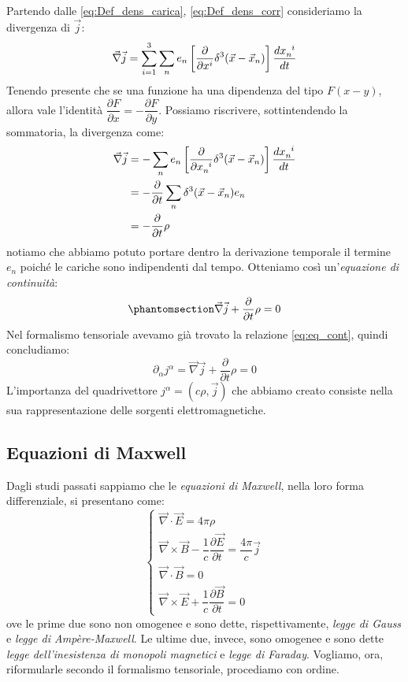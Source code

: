 Partendo dalle \eqref{eq:Def_dens_carica}, \eqref{eq:Def_dens_corr} consideriamo la divergenza di $\Vec{j}$:
\begin{equation}
    \Vec{\nabla}\Vec{j}=\sum_{i=1}^3\sum_n e_n\left[\dfrac{\partial}{\partial x^i}\delta^3(\Vec{x}-\Vec{x}_n)\right]  \dfrac{dx\indices{_n^i}}{dt}
\end{equation}
Tenendo presente che se una funzione ha una dipendenza del tipo $F(x-y)$, allora vale l'identità $\dfrac{\partial F}{\partial x}=-\dfrac{\partial F}{\partial y}$. Possiamo riscrivere, sottintendendo la sommatoria, la divergenza come:
\begin{equation}
\begin{split}
    \Vec{\nabla}\Vec{j}&=-\sum_n e_n\left[\dfrac{\partial}{\partial x\indices{_n^i}}\delta^3(\Vec{x}-\Vec{x}_n)\right] \dfrac{dx\indices{_n^i}}{dt}\\
    &=-\dfrac{\partial}{\partial t}\sum_n \delta^3(\Vec{x}-\Vec{x}_n) e_n\\
    &=-\dfrac{\partial}{\partial t} \rho 
    \end{split}
\end{equation}
notiamo che abbiamo potuto portare dentro la derivazione temporale il termine $e_n$ poiché le cariche sono indipendenti dal tempo.
Otteniamo così un'\textit{equazione di continuità}:
\begin{equation}\phantomsection\label{eq:eq_cont_elett}
    \Vec{\nabla}\Vec{j}+\dfrac{\partial}{\partial t} \rho =0
\end{equation}
Nel formalismo tensoriale avevamo già trovato la relazione \eqref{eq:eq_cont}, quindi concludiamo:
\begin{equation}
    \partial_\alpha j^\alpha=\Vec{\nabla}\Vec{j}+\dfrac{\partial}{\partial t} \rho =0
\end{equation}
L'importanza del quadrivettore $j^\alpha=(c\rho,\Vec{j})$ che abbiamo creato consiste nella sua rappresentazione delle sorgenti elettromagnetiche.

\subsection{Equazioni di Maxwell}\label{sec:2.3}
Dagli studi passati sappiamo che le \textit{equazioni di Maxwell}, nella loro forma differenziale, si presentano come:
\begin{equation}
\begin{cases}
  \Vec{\nabla}\cdot\Vec{E}=4\pi\rho\\ 
  \Vec{\nabla}\times\Vec{B}-\dfrac{1}{c}\dfrac{\partial\Vec{E}}{\partial t}=\dfrac{4\pi}{c}\Vec{j}
    \\
    \Vec{\nabla}\cdot\Vec{B}=0 \\
  \Vec{\nabla}\times\Vec{E}+\dfrac{1}{c}\dfrac{\partial\Vec{B}}{\partial t} =0
\end{cases}
\end{equation}
ove le prime due sono non omogenee e sono dette, rispettivamente, \textit{legge di Gauss} e \textit{legge di Ampère-Maxwell}. Le ultime due, invece, sono omogenee e sono dette \textit{legge dell'inesistenza di monopoli magnetici} e \textit{legge di Faraday}.
Vogliamo, ora, riformularle secondo il formalismo tensoriale, procediamo con ordine.

